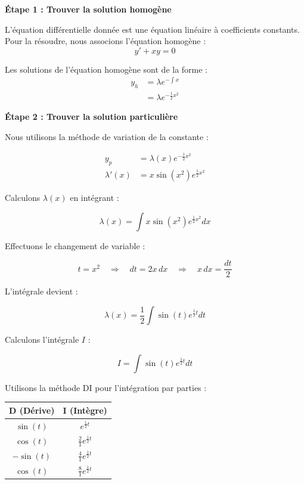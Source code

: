 \documentclass{article}
\begin{document}
\textbf{Étape 1 : Trouver la solution homogène}

L'équation différentielle donnée est une équation linéaire à coefficients constants. Pour la résoudre, nous associons l'équation homogène :
\begin{equation*}
y' + xy = 0
\end{equation*}

Les solutions de l'équation homogène sont de la forme :
\begin{align*}
    y_h &= \lambda e^{-\!\int\!x} \\
    &= \lambda e^{-\frac{1}{2}x^2}
\end{align*}


\textbf{Étape 2 : Trouver la solution particulière}

Nous utilisons la méthode de variation de la constante :

\begin{align*}
y_p &= \lambda(x) e^{ - \frac{1}{2} x^2 } \\
\lambda'(x) &= x\sin(x^2) e^{ \frac{1}{2} x^2 }
\end{align*}

Calculons \(\lambda(x)\) en intégrant :

\begin{equation*}
\lambda(x) = \int x\sin(x^2) e^{ \frac{1}{2} x^2 } dx
\end{equation*}

Effectuons le changement de variable :

\begin{equation*}
t = x^2 \quad \Rightarrow \quad dt = 2x\,dx \quad \Rightarrow \quad x\,dx = \frac{dt}{2}
\end{equation*}

L'intégrale devient :

\begin{equation*}
\lambda(x) = \frac{1}{2} \int \sin(t) e^{ \frac{1}{2} t } dt
\end{equation*}

Calculons l'intégrale \(I\) :

\begin{equation*}
I = \int \sin(t) e^{ \frac{1}{2} t } dt
\end{equation*}

Utilisons la méthode DI pour l'intégration par parties :

\begin{center}
\begin{tabular}{c|c}
\textbf{D} (Dérive) & \textbf{I} (Intègre) \\
\hline
\(\sin(t)\) & \(e^{ \frac{1}{2} t }\) \\
\(\cos(t)\) & \(\frac{2}{1} e^{ \frac{1}{2} t }\) \\
\(-\sin(t)\) & \(\frac{4}{1} e^{ \frac{1}{2} t }\) \\
\(\cos(t)\) & \(\frac{8}{1} e^{ \frac{1}{2} t }\) \\
\end{tabular}
\end{center}
\end{document}
